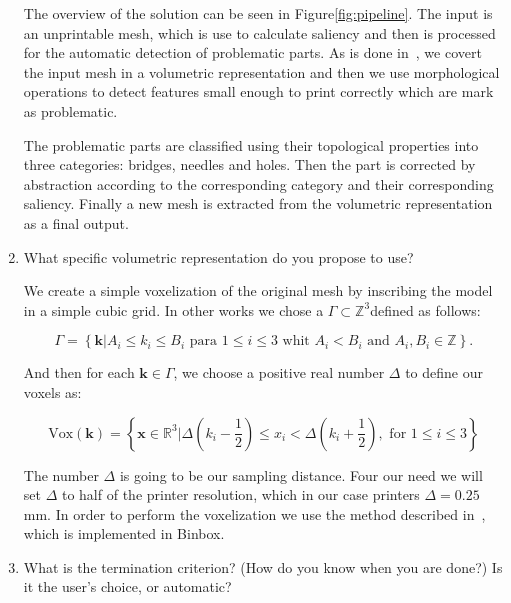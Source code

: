 \begin{enumerate}
	The overview of the solution can be seen in Figure\ref{fig:pipeline}. The input is an unprintable mesh, which is use to calculate saliency and then is processed for the automatic detection of problematic parts. As is done in~\cite{Telea2011}, we covert the input mesh in a volumetric representation and then we use morphological operations to detect features small enough to print correctly which are mark as problematic.
	
	The problematic parts are classified using their topological properties into three categories: bridges, needles and holes. Then the part is corrected by abstraction according to the corresponding category and their corresponding saliency. Finally a new mesh is extracted from the volumetric representation as a final output.
	
	\item What specific volumetric representation do you propose to use?
	
	We create a simple voxelization of the original mesh by inscribing the model in a simple cubic grid. In other works we chose a $\Gamma \subset \mathbb{Z}^3$defined as follows: 
	
	\begin{equation}
		\Gamma = \left\lbrace \textbf{k} | A_i \leq k_i \leq B_i \text{ para } 1 \leq i \leq 3 \text{ whit } A_i < B_i \text{ and } A_i, B_i \in \mathbb{Z} 	\right\rbrace 
		\label{eq:scene}.
\end{equation}

	And then for each $\textbf{k} \in \Gamma$, we choose a positive real number $\Delta$ to define our voxels as:
	
	\begin{equation}
		\text{Vox} (\textbf{k}) = \left\lbrace \textbf{x} \in \mathbb{R}^3 | \Delta \left(  k_i - \dfrac{1}{2} \right) \leq x_i < \Delta \left(  k_i + \dfrac{1}{2} \right)  , \text{ for } 1 \leq i \leq 3 \right\rbrace 
		\label{ec:voxel}
	\end{equation}
	
	The number $\Delta$ is going to be our sampling distance. Four our need we will set $\Delta$ to half of the printer resolution, which in our case printers $\Delta = 0.25$mm. In order to perform the voxelization we use the method described in~\cite{Nooruddin2003}, which is implemented in Binbox\cite{Min2016}.
	
	\item What is the termination criterion? (How do you know when you are done?) Is it the user's choice, or automatic?
	

\end{enumerate}
